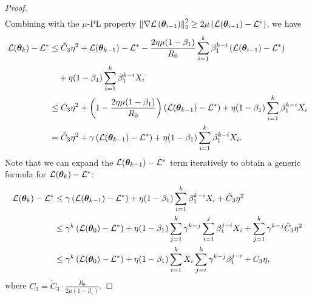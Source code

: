 \begin{proof}
\begin{align}
    \end{align}
    Combining with the $\mu$-PL property $\left\|\nabla\mathcal{L}\left({\bm{\theta}}_{i-1}\right)\right\|_2^2 \geq 2\mu\left(\mathcal{L}({\bm{\theta}}_{i-1}) - \mathcal{L}^* \right)$, we have
    \begin{align*}
        \mathcal{L}({\bm{\theta}}_{k}) - \mathcal{L}^* &\leq  \tilde{C}_3 \eta^2 + \mathcal{L}({\bm{\theta}}_{k-1}) - \mathcal{L}^* - \frac{2\eta\mu (1-\beta_1)}{R_0} \sum_{i=1}^{k} \beta_1^{k-i} \left(\mathcal{L}({\bm{\theta}}_{i-1}) - \mathcal{L}^* \right) \\
        & \quad + \eta(1-\beta_1)\sum_{i=1}^{k}\beta_1^{k-i}X_i \\
        &\leq \tilde{C}_3 \eta^2 + \left(1 - \frac{2\eta\mu (1-\beta_1)}{R_0}\right) \left(\mathcal{L}({\bm{\theta}}_{k-1})-\mathcal{L}^*\right) + \eta(1-\beta_1)\sum_{i=1}^{k}\beta_1^{k-i}X_i \\
        & = \tilde{C}_3 \eta^2 + \gamma \left(\mathcal{L}({\bm{\theta}}_{k-1})-\mathcal{L}^*\right) + \eta(1-\beta_1)\sum_{i=1}^{k}\beta_1^{k-i}X_i. 
    \end{align*}
    Note that we can expand the $\mathcal{L}({\bm{\theta}}_{k-1})-\mathcal{L}^*$ term iteratively to obtain a generic formula for $\mathcal{L}({\bm{\theta}}_k) - \mathcal{L}^*$:\begin{align*}
        \mathcal{L}({\bm{\theta}}_k) - \mathcal{L}^* & \leq \gamma \left(\mathcal{L}({\bm{\theta}}_{k-1}) - \mathcal{L}^*\right) + \eta(1-\beta_1)\sum_{i=1}^{k}\beta_1^{k-i}X_i + \tilde{C}_3 \eta^2 \\
        & \leq \gamma^k \left(\mathcal{L}({\bm{\theta}}_0) - \mathcal{L}^*\right) + \eta (1-\beta_1)\sum_{j=1}^{k}\gamma^{k-j}\sum_{i=1}^{j}\beta_1^{j-i}X_i + \sum_{j=1}^{k}\gamma^{k-j}\tilde{C}_3 \eta^2 \\
        &  \leq \gamma^k \left(\mathcal{L}({\bm{\theta}}_0) - \mathcal{L}^*\right) + \eta (1-\beta_1)\sum_{i=1}^{k}X_i  \sum_{j=i}^{k}\gamma^{k-j}\beta_1^{j-i} + C_{3} \eta,
    \end{align*}
    where $C_{3} = \tilde{C}_3 \cdot \frac{R_0}{2\mu(1-\beta_1)}$.
\end{proof}

